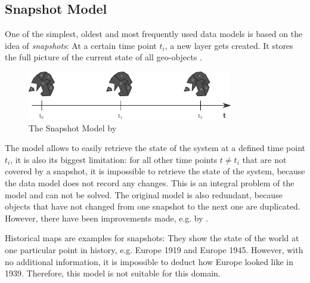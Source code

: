 
\subsection{Snapshot Model} %
\label{sub:snapshot_model}

One of the simplest, oldest and most frequently used data models is based on the idea of \emph{snapshots}: At a certain time point $t_i$, a new layer gets created. It stores the full picture of the current state of all geo-objects
\cite{Langran1988frameworktgis}.

\begin{figure}[H]
  \centering
  \includegraphics[width=0.8\textwidth]{graphics/basics/stdm/snapshot_model}
  \caption{The Snapshot Model by \cite{Langran1988frameworktgis}}
  \label{fig:snapshot_model}
\end{figure}

The model allows to easily retrieve the state of the system at a defined time point $t_i$, it is also its biggest limitation: for all other time points $t \neq t_i$ that are not covered by a snapshot, it is impossible to retrieve the state of the system, because the data model does not record any changes. This is an integral problem of the model and can not be solved. The original model is also redundant, because objects that have not changed from one snapshot to the next one are duplicated. However, there have been improvements made, e.g. by \cite{armenakis92}.

Historical maps are examples for snapshots: They show the state of the world at one particular point in history, e.g. Europe 1919 and Europe 1945. However, with no additional information, it is impossible to deduct how Europe looked like in 1939. Therefore, this model is not suitable for this domain.


